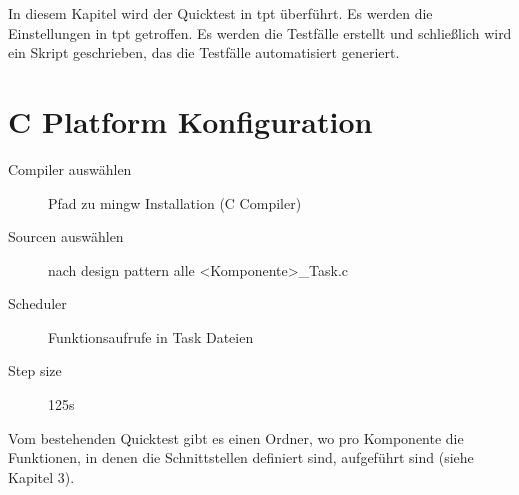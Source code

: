 In diesem Kapitel wird der Quicktest in \ac{tpt} überführt.
Es werden die Einstellungen in \ac{tpt} getroffen. Es werden die Testfälle erstellt und schließlich wird ein Skript 
geschrieben, das die Testfälle automatisiert generiert.
\section*{C Platform Konfiguration}
\begin{description}
\item[Compiler auswählen] Pfad zu mingw Installation (C Compiler)%
\item[Sourcen auswählen] nach design pattern alle <Komponente>\_Task.c %
\item[Scheduler] Funktionsaufrufe in Task Dateien
\item[Step size] 125\textmu s
\end{description}
Vom bestehenden Quicktest gibt es einen Ordner,
wo pro Komponente die Funktionen, in denen die Schnittstellen definiert sind, aufgeführt sind (siehe Kapitel 3).

